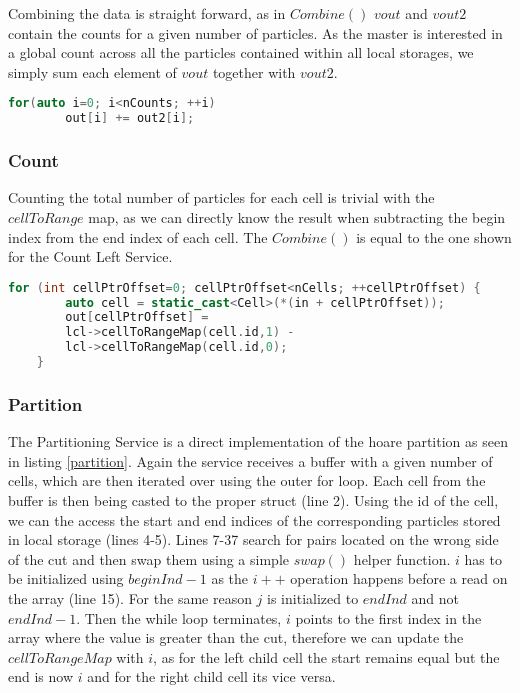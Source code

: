 \documentclass[]{article}
\begin{document}
Combining the data is straight forward, as in $Combine()$ $vout$ and $vout2$ contain the counts for a given number of particles. As the master is interested in a global count across all the particles contained within all local storages, we simply sum each element of $vout$ together with $vout2$. 

\begin{lstlisting}[language=c++, caption=Part of the Count Left Combine() method, label=ctlc]
	for(auto i=0; i<nCounts; ++i)
		out[i] += out2[i];
\end{lstlisting}

\subsubsection{Count}

Counting the total number of particles for each cell is trivial with the $cellToRange$ map, as we can directly know the result when subtracting the begin index from the end index of each cell. The $Combine()$ is equal to the one shown for the Count Left Service.

\begin{lstlisting}[language=c++, caption=Part of Count Service() method]
	for (int cellPtrOffset=0; cellPtrOffset<nCells; ++cellPtrOffset) {
		auto cell = static_cast<Cell>(*(in + cellPtrOffset));
		out[cellPtrOffset] = 
		lcl->cellToRangeMap(cell.id,1) - 
		lcl->cellToRangeMap(cell.id,0);
	}
\end{lstlisting}

\subsubsection{Partition}

The Partitioning Service is a direct implementation of the hoare partition as seen in listing \ref{partition}. Again the service receives a buffer with a given number of cells, which are then iterated over using the outer for loop. Each cell from the buffer is then being casted to the proper struct (line 2). Using the id of the cell, we can the access the start and end indices of the corresponding particles stored in local storage (lines 4-5). Lines 7-37 search for pairs located on the wrong side of the cut and then swap them using a simple $swap()$ helper function. $i$ has to be initialized using $beginInd -1$ as the $i++$ operation happens before a read on the array (line 15). For the same reason $j$ is initialized to $endInd$ and not $endInd -1$. Then the while loop terminates, $i$ points to the first index in the array where the value is greater than the cut, therefore we can update the $cellToRangeMap$ with $i$, as for the left child cell the start remains equal but the end is now $i$ and for the right child cell its vice versa. 
\end{document}
